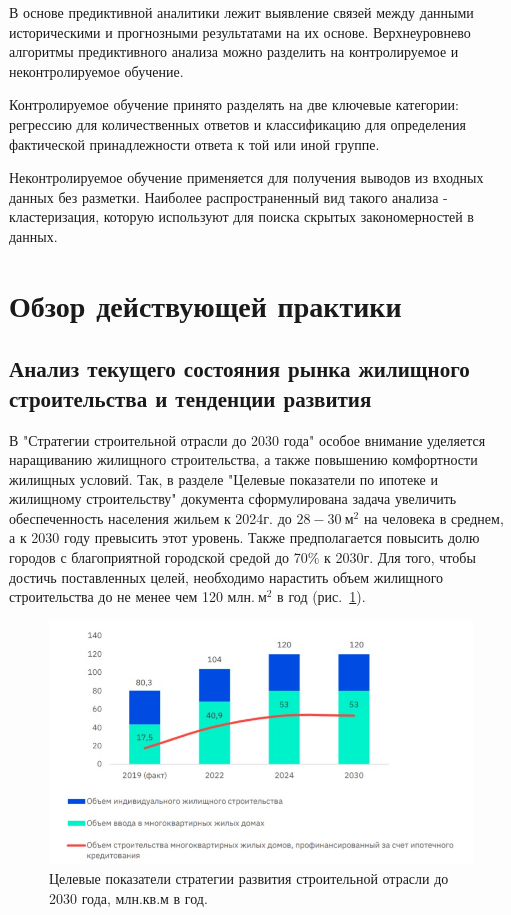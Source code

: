 \documentclass[12pt,a4paper]{article} %
\begin{document}
В основе предиктивной аналитики лежит выявление связей между данными историческими и прогнозными результатами на их основе. Верхнеуровнево алгоритмы предиктивного анализа можно разделить на контролируемое и неконтролируемое обучение\cite{Mohri}.

Контролируемое обучение принято разделять на две ключевые категории: регрессию для количественных ответов и классификацию для определения фактической принадлежности ответа к той или иной группе. 
 
Неконтролируемое обучение применяется для получения выводов из входных данных без разметки. Наиболее распространенный вид такого анализа - кластеризация, которую используют для поиска скрытых закономерностей в данных.


\newpage
\section{Обзор действующей практики}
\subsection{Анализ текущего состояния рынка жилищного строительства и тенденции развития}

В "Стратегии строительной отрасли до 2030 года"\cite{Asso} особое внимание уделяется наращиванию жилищного строительства, а также повышению комфортности жилищных условий. Так, в разделе "Целевые показатели по ипотеке и жилищному строительству" документа сформулирована задача увеличить обеспеченность населения жильем к 2024г. до $28-30~\text{м}^2$ на человека в среднем, а к 2030 году превысить этот уровень. Также предполагается повысить долю городов с благоприятной городской средой до 70\% к 2030г. Для того, чтобы достичь поставленных целей, необходимо нарастить объем жилищного строительства до не менее чем 120 млн.$~\text{м}^2$ в год (рис.~\ref{fig:develop_dynam}).

\begin{figure}[h]
	
	\centering
	
	\includegraphics[width=0.7\linewidth]{develop_dynam.jpg}
	
	\caption{Целевые показатели стратегии развития строительной отрасли до 2030 года, млн.кв.м в год.}
	
	\label{fig:develop_dynam}
	
\end{figure}
\end{document}
